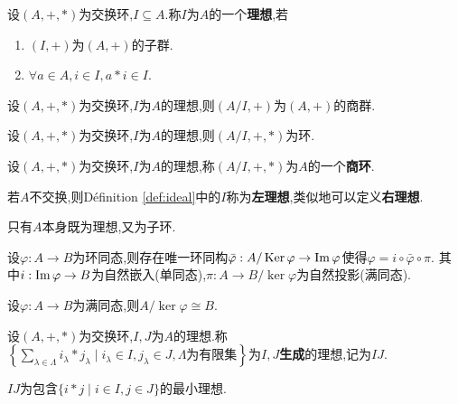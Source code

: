 \begin{deff}\label{def:ideal}
    设$(A, +, *)$为交换环,$I \subseteq A$.称$I$为$A$的一个\textbf{理想},若
    \begin{enumerate}
        \item $(I, +)$为$(A, +)$的子群.
        \item $\forall a \in A, i \in I, a * i \in I$.
    \end{enumerate}
\end{deff}

\begin{prop}
    设$(A, +, *)$为交换环,$I$为$A$的理想,则$(A/I, +)$为$(A, +)$的商群.
\end{prop}

\begin{prop}
    设$(A, +, *)$为交换环,$I$为$A$的理想,则$(A/I, +, *)$为环.
\end{prop}

\begin{deff}
    设$(A, +, *)$为交换环,$I$为$A$的理想,称$(A/I, +, *)$为$A$的一个\textbf{商环}.
\end{deff}

\begin{rqq}
    若$A$不交换,则Définition \ref{def:ideal}中的$I$称为\textbf{左理想},类似地可以定义\textbf{右理想}.
\end{rqq}

\begin{prop}
    只有$A$本身既为理想,又为子环.
\end{prop}

\begin{thm}
    设$\varphi: A \to B$为环同态,则存在唯一环同构$\bar{\varphi}: A / \operatorname{Ker} \varphi \to \operatorname{Im} \varphi$使得$\varphi = i \circ \bar{\varphi} \circ \pi$.
    其中$i: \operatorname{Im} \varphi \to B$为自然嵌入(单同态),$\pi: A \to B / \ker \varphi$为自然投影(满同态).
\end{thm}

\begin{prop}
    设$\varphi: A \to B$为满同态,则$A / \ker \varphi \cong B$.
\end{prop}

\begin{deff}
    设$(A, +, *)$为交换环,$I, J$为$A$的理想.称$\left\{ \sum\limits_{\lambda \in \Lambda} i_{\lambda} * j_{\lambda} \mid i_{\lambda} \in I, j_{\lambda} \in J, \Lambda \text{为有限集} \right\}$为$I, J$\textbf{生成}的理想,记为$IJ$.
\end{deff}

\begin{prop}
    $IJ$为包含$\{ i * j \mid i \in I, j \in J \}$的最小理想.
\end{prop}


